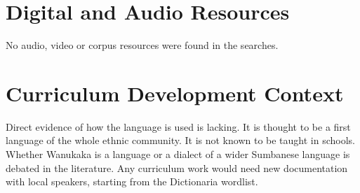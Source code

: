 \documentclass[12pt]{article}
\begin{document}
\section{Digital and Audio Resources}
No audio, video or corpus resources were found in the searches.

\section{Curriculum Development Context}
Direct evidence of how the language is used is lacking. It is thought to be a first language of the whole ethnic community. It is not known to be taught in schools. Whether Wanukaka is a language or a dialect of a wider Sumbanese language is debated in the literature. Any curriculum work would need new documentation with local speakers, starting from the Dictionaria wordlist.
\end{document}

